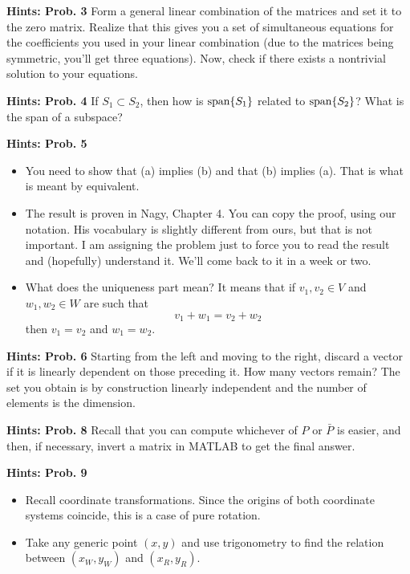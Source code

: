 \documentclass[letterpaper]{article}
\begin{document}
\vspace{1cm}

\noindent \textbf{Hints: Prob. 3} Form a general linear combination of the matrices and set it to the zero matrix. Realize that this gives you a set of simultaneous equations for the coefficients you used in your linear combination (due to the matrices being symmetric, you'll get three equations). Now, check if there exists a nontrivial solution to your equations.

\vspace{1cm}


\noindent \textbf{Hints: Prob. 4} If $S_1\subset S_2$, then how is $\textrm{span} \{ S_1 \}$ related to $\textrm{span} \{ S_2 \}$? What is the span of a subspace?

\vspace{1cm}


\noindent \textbf{Hints: Prob. 5}
\begin{itemize}
\item You need to show that (a) implies (b) and that (b) implies (a). That is what is meant by equivalent.
\item The result is proven in Nagy, Chapter 4. You can copy the proof, using our notation. His vocabulary is slightly different from ours, but that is not important. I am assigning the problem just to force you to read the result and (hopefully) understand it. We'll come back to it in a week or two.
\item What does the uniqueness part mean? It means that if $v_1, v_2 \in V$ and $w_1, w_2 \in W$ are such that $$v_1+w_1 = v_2 + w_2$$
    then $v_1=v_2$ and $w_1=w_2$.
\end{itemize}

\vspace{1cm}

\noindent \textbf{Hints: Prob. 6} Starting from the left and moving to the right, discard a vector if it is linearly dependent on those preceding it. How many vectors remain? The set you obtain is by construction linearly independent and the number of elements is the dimension.

\vspace{1cm}

\noindent \textbf{Hints: Prob. 8} Recall that you can compute whichever of $P$ or $\bar{P}$ is easier, and then, if necessary, invert a matrix in MATLAB to get the final answer.

\vspace{1cm}
\noindent \textbf{Hints: Prob. 9}
\begin{itemize}
	\item Recall coordinate transformations. Since the origins of both coordinate systems coincide, this is a case of pure rotation.
	\item Take any generic point $(x,y)$ and use trigonometry to find the relation between $(x_W,y_W)$ and $(x_R,y_R)$.
\end{itemize}
\end{document}
